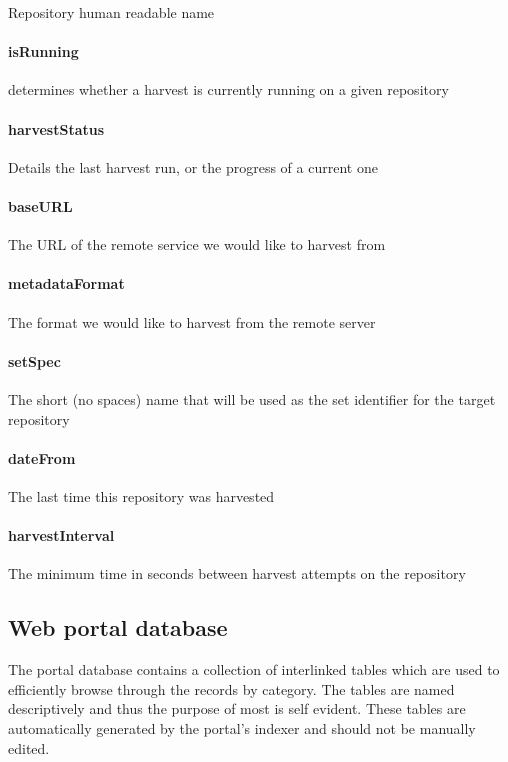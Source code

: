 \documentclass[a4paper,11pt]{article}
\begin{document}
Repository human readable name

\paragraph{isRunning} 

determines whether a harvest is currently running on a given repository

\paragraph{harvestStatus} 

Details the last harvest run, or the progress of a current one

\paragraph{baseURL} The URL of the remote service we would like to harvest from

\paragraph{metadataFormat} 

The format we would like to harvest from the remote server

\paragraph{setSpec} 

The short (no spaces) name that will be used as the set identifier for the target repository

\paragraph{dateFrom} 

The last time this repository was harvested 

\paragraph{harvestInterval} The minimum time in seconds between harvest attempts on the repository

\subsection{Web portal database}
\label{sec:database_layout:web_portal_database}

The portal database contains a collection of interlinked tables which are used to efficiently browse through the records by category. The tables are named descriptively and thus the purpose of most is self evident. These tables are automatically generated by the portal's indexer and should not be manually edited.
\end{document}
